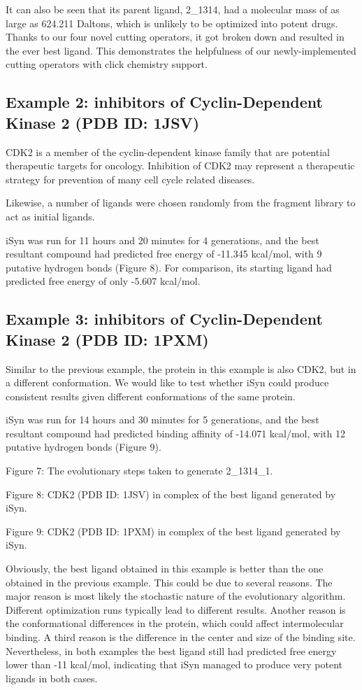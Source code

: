 It can also be seen that its parent ligand, 2_1314, had a molecular mass of as large as 624.211 Daltons, which is unlikely to be optimized into potent drugs. Thanks to our four novel cutting operators, it got broken down and resulted in the ever best ligand. This demonstrates the helpfulness of our newly-implemented cutting operators with click chemistry support.

\subsection{Example 2: inhibitors of Cyclin-Dependent Kinase 2 (PDB ID: 1JSV)}

CDK2 is a member of the cyclin-dependent kinase family that are potential therapeutic targets for oncology. Inhibition of CDK2 may represent a therapeutic strategy for prevention of many cell cycle related diseases.

Likewise, a number of ligands were chosen randomly from the fragment library to act as initial ligands.

iSyn was run for 11 hours and 20 minutes for 4 generations, and the best resultant compound had predicted free energy of -11.345 kcal/mol, with 9 putative hydrogen bonds (Figure 8). For comparison, its starting ligand had predicted free energy of only -5.607 kcal/mol.

\subsection{Example 3: inhibitors of Cyclin-Dependent Kinase 2 (PDB ID: 1PXM)}

Similar to the previous example, the protein in this example is also CDK2, but in a different conformation. We would like to test whether iSyn could produce consistent results given different conformations of the same protein.

iSyn was run for 14 hours and 30 minutes for 5 generations, and the best resultant compound had predicted binding affinity of -14.071 kcal/mol, with 12 putative hydrogen bonds (Figure 9).
 
Figure 7: The evolutionary steps taken to generate 2_1314_1.

Figure 8: CDK2 (PDB ID: 1JSV) in complex of the best ligand generated by iSyn.

Figure 9: CDK2 (PDB ID: 1PXM) in complex of the best ligand generated by iSyn.

Obviously, the best ligand obtained in this example is better than the one obtained in the previous example. This could be due to several reasons. The major reason is most likely the stochastic nature of the evolutionary algorithm. Different optimization runs typically lead to different results. Another reason is the conformational differences in the protein, which could affect intermolecular binding. A third reason is the difference in the center and size of the binding site. Nevertheless, in both examples the best ligand still had predicted free energy lower than -11 kcal/mol, indicating that iSyn managed to produce very potent ligands in both cases.

